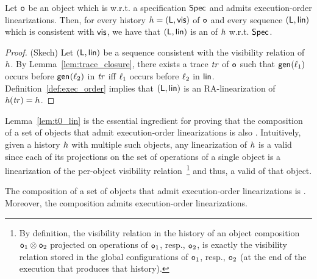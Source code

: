 \begin{lemma}\label{lem:t0_lin}
Let $\mathtt{o}$ be an object which is \crdtlinearizable{} w.r.t. a specification $\mathsf{Spec}$ and admits execution-order linearizations. Then, for every history ${h}=(\mathsf{L},\mathsf{vis})$ of $\mathtt{o}$ and every sequence $(\mathsf{L},\mathsf{lin})$ which is consistent with $\mathsf{vis}$, we have that $(\mathsf{L},\mathsf{lin})$ is an \crdtlinearization{} of ${h}$ w.r.t. $\mathsf{Spec}$.
\end{lemma}
\begin{proof}(Skech)
Let $(\mathsf{L},\mathsf{lin})$ be a sequence consistent with the visibility relation of ${h}$. By Lemma~\ref{lem:trace_closure}, there exists a trace $\mathit{tr}$ of $\mathtt{o}$ such that  $\mathsf{gen}_{}(\ell_1)$ occurs before $\mathsf{gen}_{}(\ell_2)$ in $\mathit{tr}$ iff $\ell_1$ occurs before $\ell_2$ in $\mathsf{lin}$. Definition~\ref{def:exec_order} implies that $(\mathsf{L},\mathsf{lin})$ is an RA-linearization of $\mathit{h}({\mathit{tr})}={h}$.
\end{proof}

Lemma~\ref{lem:t0_lin} is the essential ingredient for proving that the composition of a set of \crdtlinearizable{} objects that admit execution-order linearizations is also \crdtlinearizable{}. Intuitively, given a history ${h}$ with multiple such objects, any linearization of ${h}$ is a valid \crdtlinearization{} since each of its projections on the set of operations of a single object is a linearization of the per-object visibility relation~\footnote{By definition, the visibility relation in the history of an object composition $\mathtt{o}_1\otimes\mathtt{o}_2$ projected on operations of $\mathtt{o}_1$, resp., $\mathtt{o}_2$, is exactly the visibility relation stored in the global configurations of $\mathtt{o}_1$, resp., $\mathtt{o}_2$ (at the end of the execution that produces that history).}  and thus, a valid \crdtlinearization{} of that object.

\begin{theorem}\label{th:comp_execution_order}
The composition of a set of \crdtlinearizable{} objects that admit execution-order linearizations is \crdtlinearizable{}. Moreover, the composition admits execution-order linearizations.
\end{theorem}


